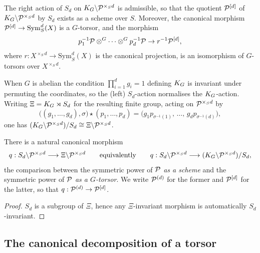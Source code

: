 \documentclass[11pt]{article}
\begin{document}
\begin{prop}\label{prop:symmetric_power_torsor}
The right action of $S_d$ on $K_{G} \backslash \mathcal{P}^{\times_S d}$ is admissible, so
that the quotient $\mathcal{P}^{[d]}$ of $K_{G} \backslash \mathcal{P}^{\times_S d}$ by $S_d$
exists as a scheme over $S$.  Moreover, the canonical morphism
$\mathcal{P}^{[d]} \to \mathrm{Sym}_S^d(X)$ is a $G$-torsor, and the morphism
\[
p_1^{-1}\mathcal{P} \otimes^G \cdots \otimes^G p_d^{-1}\mathcal{P} \to r^{-1}\mathcal{P}^{[d]},
\]
where $r : X^{\times_S d} \to \mathrm{Sym}_S^d(X)$ is the canonical projection,
is an isomorphism of $G$-torsors over $X^{\times_S d}$.
\end{prop}

When $G$ is abelian the condition $\prod_{i=1}^d g_i = 1$ defining $K_{G}$ is
invariant under permuting the coordinates, so the (left) $S_d$-action normalises
the $K_{G}$-action.  Writing $\Xi = K_{G} \rtimes S_d$ for the resulting finite
group, acting on $\mathcal{P}^{\times_S d}$ by
\[
\bigl((g_1,\dots,g_d),\sigma\bigr) \star (p_1,\dots,p_d)
   = \bigl(g_1 p_{\sigma^{-1}(1)},\,\dots,\,g_d p_{\sigma^{-1}(d)}\bigr),
\]
one has $(K_{G} \backslash \mathcal{P}^{\times_S d})/S_d \cong \Xi \backslash \mathcal{P}^{\times_S d}$.

\begin{cor}\label{cor:sym-power-quotient}
There is a natural canonical morphism
\[
q : S_d \backslash \mathcal{P}^{\times_S d} \longrightarrow \Xi \backslash \mathcal{P}^{\times_S d}
\qquad\text{equivalently}\qquad
q : S_d \backslash \mathcal{P}^{\times_S d} \longrightarrow (K_{G} \backslash \mathcal{P}^{\times_S d})/S_d ,
\]
the comparison between the symmetric power of $\mathcal{P}$ \emph{as a scheme} and the
symmetric power of $\mathcal{P}$ \emph{as a $G$-torsor}.  We write $\mathcal{P}^{(d)}$ for the
former and $\mathcal{P}^{[d]}$ for the latter, so that $q : \mathcal{P}^{(d)} \to \mathcal{P}^{[d]}$.
\end{cor}
\begin{proof}
$S_d$ is a subgroup of $\Xi$, hence any $\Xi$-invariant morphism is
automatically $S_d$-invariant.
\end{proof}

\subsection{The canonical decomposition of a torsor}\label{subsec:decomposition}
\end{document}
